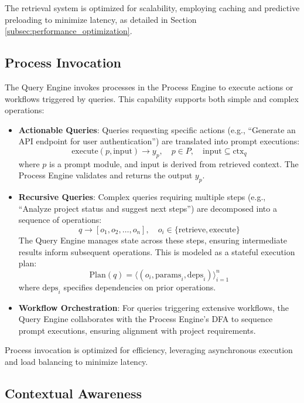 \documentclass[11pt]{article}
\begin{document}
The retrieval system is optimized for scalability, employing caching and predictive preloading to minimize latency, as detailed in Section \ref{subsec:performance_optimization}.

\subsection{Process Invocation}
\label{subsec:process_invocation}

The Query Engine invokes processes in the Process Engine to execute actions or workflows triggered by queries. This capability supports both simple and complex operations:

\begin{itemize}
    \item \textbf{Actionable Queries}: Queries requesting specific actions (e.g., “Generate an API endpoint for user authentication”) are translated into prompt executions:
        \[
        \text{execute}(p, \text{input}) \rightarrow y_p, \quad p \in P, \quad \text{input} \subseteq \text{ctx}_q
        \]
        where \( p \) is a prompt module, and \( \text{input} \) is derived from retrieved context. The Process Engine validates and returns the output \( y_p \).

    \item \textbf{Recursive Queries}: Complex queries requiring multiple steps (e.g., “Analyze project status and suggest next steps”) are decomposed into a sequence of operations:
        \[
        q \rightarrow [o_1, o_2, \ldots, o_n], \quad o_i \in \{\text{retrieve}, \text{execute}\}
        \]
        The Query Engine manages state across these steps, ensuring intermediate results inform subsequent operations. This is modeled as a stateful execution plan:
        \[
        \text{Plan}(q) = \langle (o_i, \text{params}_i, \text{deps}_i) \rangle_{i=1}^n
        \]
        where \( \text{deps}_i \) specifies dependencies on prior operations.

    \item \textbf{Workflow Orchestration}: For queries triggering extensive workflows, the Query Engine collaborates with the Process Engine’s DFA to sequence prompt executions, ensuring alignment with project requirements.
\end{itemize}

Process invocation is optimized for efficiency, leveraging asynchronous execution and load balancing to minimize latency.

\subsection{Contextual Awareness}
\label{subsec:contextual_awareness}
\end{document}
